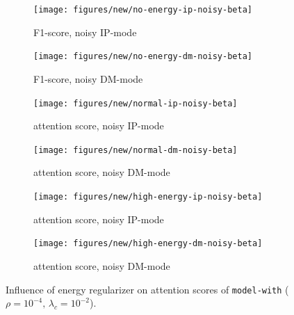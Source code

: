 \begin{figure}[!h]
\centering
\begin{subfigure}{.5\textwidth}
  \centering
  \texttt{[image: figures/new/no-energy-ip-noisy-beta]}
  \caption{F1-score, noisy IP-mode}
  \label{fig:exp-10-a}
\end{subfigure}%
\begin{subfigure}{.5\textwidth}
  \centering
  \texttt{[image: figures/new/no-energy-dm-noisy-beta]}
  \caption{F1-score, noisy DM-mode}
 \label{fig:exp-10-b} 
\end{subfigure}
\begin{subfigure}{.5\textwidth}
  \centering
  \texttt{[image: figures/new/normal-ip-noisy-beta]}
  \caption{attention score, noisy IP-mode}
   \label{fig:exp-10-c} 
\end{subfigure}%
\begin{subfigure}{.5\textwidth}
  \centering
  \texttt{[image: figures/new/normal-dm-noisy-beta]}
  \caption{attention score, noisy DM-mode}
   \label{fig:exp-10-d} 
\end{subfigure}
\begin{subfigure}{.5\textwidth}
  \centering
  \texttt{[image: figures/new/high-energy-ip-noisy-beta]}
  \caption{attention score, noisy IP-mode}
   \label{fig:exp-10-e} 
\end{subfigure}%
\begin{subfigure}{.5\textwidth}
  \centering
  \texttt{[image: figures/new/high-energy-dm-noisy-beta]}
  \caption{attention score, noisy DM-mode}
   \label{fig:exp-10-f} 
\end{subfigure}
\caption[Robustness generalisation]{Influence of energy regularizer on attention scores of \texttt{model-with} ($\rho=10^{-4},\,\lambda_c=10^{-2}$).}
\label{fig:exp-10}
\end{figure}

